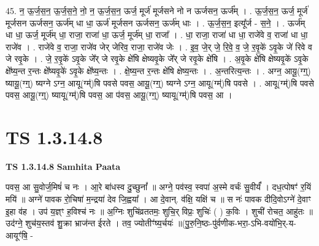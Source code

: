 \documentclass[17pt]{extarticle}
\begin{document}
45. न॒ ऊ॒र्ज॒स॒न॒ ऊ॒र्ज॒स॒ने॒ नो॒ न॒ ऊ॒र्ज॒स॒न॒ ऊर्ज॒ मूर्ज॑ मूर्जसने नो न ऊर्जसन॒ ऊर्ज᳚म् । . ऊ॒र्ज॒स॒न॒ ऊर्ज॒ मूर्ज॑ मूर्जसन ऊर्जसन॒ ऊर्ज॑म् धा धा॒ ऊर्ज॑ मूर्जसन ऊर्जसन॒ ऊर्ज॑म् धाः । . ऊ॒र्ज॒स॒न॒ इत्यू᳚र्ज - स॒ने॒ । . ऊर्ज॑म् धा धा॒ ऊर्ज॒ मूर्ज॑म् धा॒ राजा॒ राजा॑ धा॒ ऊर्ज॒ मूर्ज॑म् धा॒ राजा᳚ । . धा॒ राजा॒ राजा॑ धा धा॒ राजे॑वे व॒ राजा॑ धा धा॒ राजे॑व । . राजे॑वे व॒ राजा॒ राजे॑व जेर् जेरिव॒ राजा॒ राजे॑व जेः । . इ॒व॒ जे॒र् जे॒ रि॒वे॒ व॒ जे॒ र॒वृ॒के॑ ऽवृ॒के जे॑ रिवे व जे रवृ॒के । . जे॒ र॒वृ॒के॑ ऽवृ॒के जे᳚र् जे रवृ॒के क्षे॑षि क्षेष्यवृ॒के जे᳚र् जे रवृ॒के क्षे॑षि । . अ॒वृ॒के क्षे॑षि क्षेष्यवृ॒के॑ ऽवृ॒के क्षे᳚ष्य॒न्त र॒न्तः क्षे᳚ष्यवृ॒के॑ ऽवृ॒के क्षे᳚ष्य॒न्तः । . क्षे॒ष्य॒न्त र॒न्तः क्षे॑षि क्षेष्य॒न्तः । . अ॒न्तरित्य॒न्तः । . अग्न॒ आयू॒(ग्ग्॒) ष्यायू॒(ग्ग्॒) ष्यग्ने ऽग्न॒ आयू(ग्म्॑)षि पवसे पवस॒ आयू॒(ग्ग्॒) ष्यग्ने ऽग्न॒ आयू(ग्म्॑)षि पवसे । . आयू(ग्म्॑)षि पवसे पवस॒ आयू॒(ग्ग्॒) ष्यायू(ग्म्॑)षि पवस॒ आ प॑वस॒ आयू॒(ग्ग्॒) ष्यायू(ग्म्॑)षि पवस॒ आ । \newline
\pagebreak
{}
\section*{ TS 1.3.14.8 }

\textbf{TS 1.3.14.8 } \newline
\textbf{Samhita Paata} \newline

पवस॒ आ सु॒वोर्ज॒मिषं॑ च नः । आ॒रे बा॑धस्व दु॒च्छुनां᳚ ॥ अग्ने॒ पव॑स्व॒ स्वपा॑ अ॒स्मे वर्चः॑ सु॒वीर्यं᳚ । दध॒त्पोषꣳ॑ र॒यिं मयि॑ ॥ अग्ने॑ पावक रो॒चिषा॑ म॒न्द्रया॑ देव जि॒ह्वया᳚ । आ दे॒वान्. व॑क्षि॒ यक्षि॑ च ॥ स नः॑ पावक दीदि॒वोऽग्ने॑ दे॒वाꣳ इ॒हा व॑ह । उप॑ य॒ज्ञ्ꣳ ह॒विश्च॑ नः ॥ अ॒ग्निः शुचि॑व्रततमः॒ शुचि॒र् विप्रः॒ शुचिः॑ ( ) क॒विः । शुची॑ रोचत॒ आहु॑तः ॥ उद॑ग्ने॒ शुच॑य॒स्तव॑ शु॒क्रा भ्राज॑न्त ईरते । तव॒ ज्योतीꣳ॑ष्य॒र्चयः॑ ॥(पु॒रु॒नि॒ष्ठः-पु॑र्वणीक-भरा॒-ऽभि-वयो॑भि॒र्-य-आयूꣳ॑षि॒ - \newline
\end{document}
